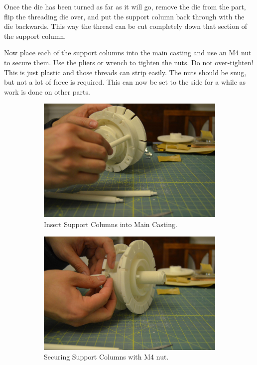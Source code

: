 \documentclass[openany]{book}
\begin{document}
Once the die has been turned as far as it will go, remove the die from the part, flip the threading die over, and put the support column back through with the die backwards. This way the thread can be cut completely down that section of the support column.

Now place each of the support columns into the main casting and use an M4 nut to secure them. Use the pliers or wrench to tighten the nuts. Do not over-tighten! This is just plastic and those threads can strip easily. The nuts should be snug, but not a lot of force is required. This can now be set to the side for a while as work is done on other parts.

\begin{figure}[!ht]
	\centering
	\begin{subfigure}{.4\textwidth}
		\centering
		\includegraphics[width=.9\textwidth]{images/image60.jpg}
		\caption{Insert Support Columns into Main Casting.}
		\label{fig:image60}	
	\end{subfigure}
	\begin{subfigure}{.4\textwidth}
		\centering
		\includegraphics[width=.9\textwidth]{images/image37.jpg}
		\caption{Securing Support Columns with M4 nut.}
		\label{fig:image37}	
	\end{subfigure}
	\caption{}
\end{figure}
\end{document}
